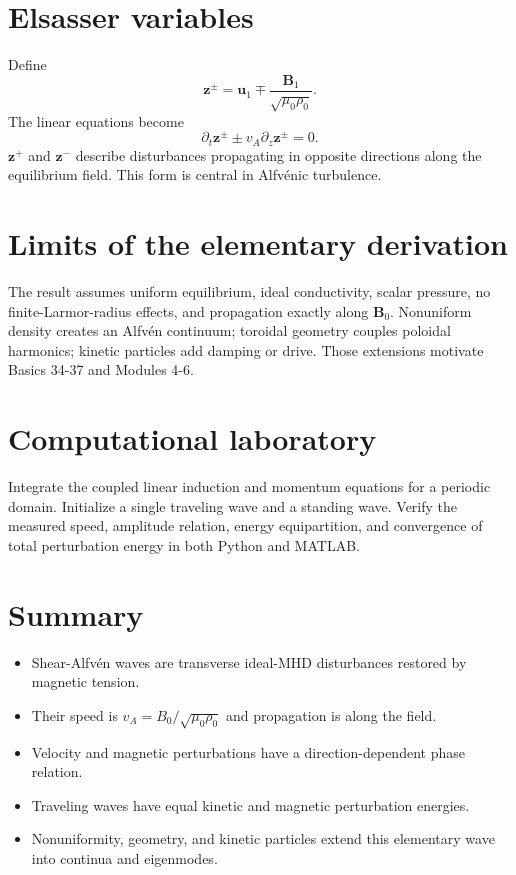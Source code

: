 \documentclass[11pt]{article}
\begin{document}
\section{Elsasser variables}

Define
\begin{equation}
\mathbf z^\pm=\mathbf u_1\mp\frac{\mathbf B_1}{\sqrt{\mu_0\rho_0}}.
\end{equation}
The linear equations become
\begin{equation}
\partial_t\mathbf z^\pm\pm v_A\partial_z\mathbf z^\pm=0.
\end{equation}
$\mathbf z^+$ and $\mathbf z^-$ describe disturbances propagating in opposite directions along the equilibrium field. This form is central in Alfvénic turbulence.


\section{Limits of the elementary derivation}

The result assumes uniform equilibrium, ideal conductivity, scalar pressure, no finite-Larmor-radius effects, and propagation exactly along $\mathbf B_0$. Nonuniform density creates an Alfvén continuum; toroidal geometry couples poloidal harmonics; kinetic particles add damping or drive. Those extensions motivate Basics 34-37 and Modules 4-6.


\section{Computational laboratory}
Integrate the coupled linear induction and momentum equations for a periodic domain. Initialize a single traveling wave and a standing wave. Verify the measured speed, amplitude relation, energy equipartition, and convergence of total perturbation energy in both Python and MATLAB.

\section{Summary}
\begin{itemize}[leftmargin=1.6em]
\item Shear-Alfvén waves are transverse ideal-MHD disturbances restored by magnetic tension.
\item Their speed is $v_A=B_0/\sqrt{\mu_0\rho_0}$ and propagation is along the field.
\item Velocity and magnetic perturbations have a direction-dependent phase relation.
\item Traveling waves have equal kinetic and magnetic perturbation energies.
\item Nonuniformity, geometry, and kinetic particles extend this elementary wave into continua and eigenmodes.
\end{itemize}
\end{document}
